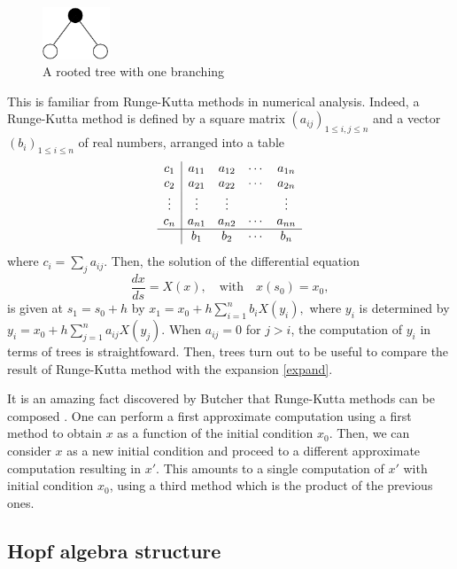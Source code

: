 \documentclass[10pt,here,feynmf]{article}
\begin{document}
\begin{figure}
\begin{center}
\includegraphics[width=2cm]{t3.pdf}
\caption{A rooted tree with one branching}
\label{treeexample}
\end{center}
\end{figure}



This is familiar from Runge-Kutta methods in numerical analysis. Indeed, a Runge-Kutta method is defined by a square matrix $(a_{ij})_{1\leq i,j\leq n}$ and a vector $(b_{i})_{1\leq i\leq n}$ of real numbers, arranged into a table
\begin{equation}
\begin{array}{c|cccc} 
c_{1}&a_{11}&a_{12}&\cdots&a_{1n}\cr
c_{2}&a_{21}&a_{22}&\cdots&a_{2n}\cr
\vdots&\vdots&\vdots&&\vdots\cr
c_{n}&a_{n1}&a_{n2}&\cdots&a_{nn}\cr
\hline
&b_{1}&b_{2}&\cdots&b_{n}
\end{array}
\label{RK}
\end{equation}
where $c_{i}=\sum_{j}a_{ij}$.  Then, the solution of the differential equation
\begin{equation}
\frac{dx}{ds}=X(x),\quad\mathrm{with}\quad x(s_{0})=x_{0},\label{diffeqRK}
\end{equation}
is given at $s_{1}=s_{0}+h$ by
$
x_{1}=x_{0}+h\sum_{i=1}^{n}b_{i}X(y_{i}),
$
where $y_{i}$ is determined by
$
y_{i}=x_{0}+h\sum_{j=1}^{n}a_{ij}X(y_{j}).
$
When $a_{ij}=0$ for $j>i$, the computation of $y_{i}$ in terms of trees is straightfoward. Then, trees turn out to be useful to compare the result of Runge-Kutta method with the expansion  \eqref{expand}. 


It is an amazing fact discovered by Butcher that Runge-Kutta methods can be composed \cite{butcher}. One can perform a first approximate computation using a first method to obtain $x$ as a function of the initial condition $x_{0}$.   Then, we can consider $x$ as a new initial condition and proceed to a different approximate computation resulting in $x'$. This amounts to a single computation of $x'$ with initial condition $x_{0}$, using a third method which is the product of the previous ones. 


\subsection{Hopf algebra structure}
\end{document}
